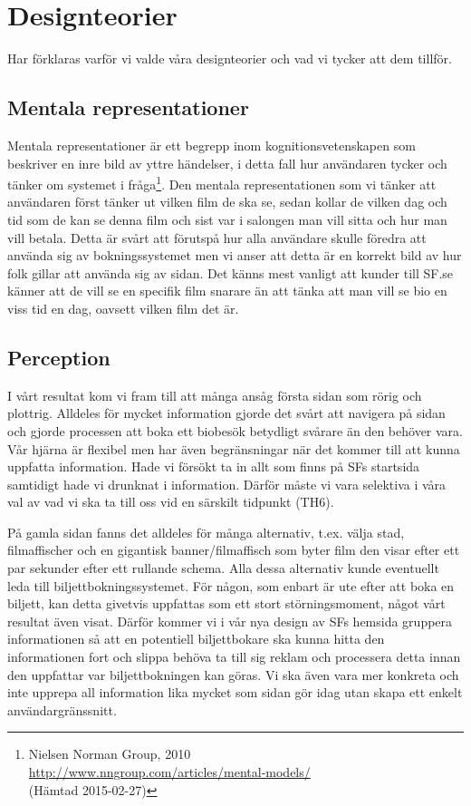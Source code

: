 \documentclass[swedish,a4paper,11pt]{article}
\begin{document}
\newpage
\section{Designteorier}
Har förklaras varför vi valde våra designteorier och vad vi tycker att dem tillför.

\subsection{Mentala representationer} 
Mentala representationer är ett begrepp inom kognitionsvetenskapen som beskriver en inre bild av yttre händelser, i detta fall hur användaren tycker och tänker om systemet i fråga\footnote{Nielsen Norman Group, 2010 \\ \url{http://www.nngroup.com/articles/mental-models/}\\ (Hämtad 2015-02-27)}. Den mentala representationen som vi tänker att användaren först tänker ut vilken film de ska se, sedan kollar de vilken dag och tid som de kan se denna film och sist var i salongen man vill sitta och hur man vill betala. Detta är svårt att förutspå hur alla användare skulle föredra att använda sig av bokningssystemet men vi anser att detta är en korrekt bild av hur folk gillar att använda sig av sidan. Det känns mest vanligt att kunder till SF.se känner att de vill se en specifik film snarare än att tänka att man vill se bio en viss tid en dag, oavsett vilken film det är.

\subsection{Perception} 
I vårt resultat kom vi fram till att många ansåg första sidan som rörig och plottrig. Alldeles för mycket information gjorde det svårt att navigera på sidan och gjorde processen att boka ett biobesök betydligt svårare än den behöver vara. Vår hjärna är flexibel men har även begränsningar när det kommer till att kunna uppfatta information. Hade vi försökt ta in allt som finns på SFs startsida samtidigt hade vi drunknat i information. Därför måste vi vara selektiva i våra val av vad vi ska ta till oss vid en särskilt tidpunkt (TH6).

På gamla sidan fanns det alldeles för många alternativ, t.ex. välja stad, filmaffischer och en gigantisk banner/filmaffisch som byter film den visar efter ett par sekunder efter ett rullande schema. Alla dessa alternativ kunde eventuellt leda till biljettbokningssystemet. För någon, som enbart är ute efter att boka en biljett, kan detta givetvis uppfattas som ett stort störningsmoment, något vårt resultat även visat. Därför kommer vi i vår nya design av SFs hemsida gruppera informationen så att en potentiell biljettbokare ska kunna hitta den informationen fort och slippa behöva ta till sig reklam och processera detta innan den uppfattar var biljettbokningen kan göras. Vi ska även vara mer konkreta och inte upprepa all information lika mycket som sidan gör idag utan skapa ett enkelt användargränssnitt.   
\end{document}
